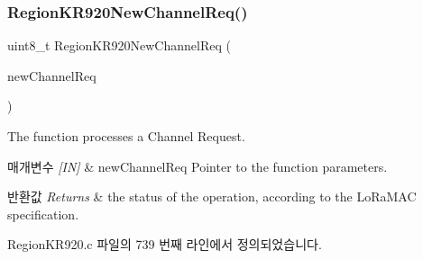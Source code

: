 \subsubsection{\texorpdfstring{Region\+K\+R920\+New\+Channel\+Req()}{RegionKR920NewChannelReq()}}
{\footnotesize\ttfamily uint8\+\_\+t Region\+K\+R920\+New\+Channel\+Req (\begin{DoxyParamCaption}\item[{\mbox{\hyperlink{group___r_e_g_i_o_n_gae2abcdb6dbb843c9faf5fd3009eca9d6}{New\+Channel\+Req\+Params\+\_\+t}} $\ast$}]{new\+Channel\+Req }\end{DoxyParamCaption})}



The function processes a Channel Request. 


\begin{DoxyParams}{매개변수}
{\em \mbox{[}\+I\+N\mbox{]}} & new\+Channel\+Req Pointer to the function parameters.\\
\hline
\end{DoxyParams}

\begin{DoxyRetVals}{반환값}
{\em Returns} & the status of the operation, according to the Lo\+Ra\+M\+AC specification. \\
\hline
\end{DoxyRetVals}


Region\+K\+R920.\+c 파일의 739 번째 라인에서 정의되었습니다.


